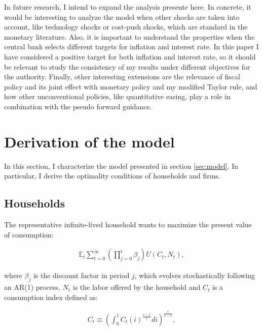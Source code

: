 \documentclass[12pt]{article}
\numberwithin{equation}{section}
\begin{document}
In future research, I intend to expand the analysis presente here. In concrete, it would be interesting to analyze the model when other shocks are taken into account, like technology shocks or cost-push shocks, which are standard in the monetary literature. Also, it is important to understand the properties when the central bank selects different targets for inflation and interest rate. In this paper I have considered a positive target for both inflation and interest rate, so it should be relevant to study the consistency of my results under different objectives for the authority. Finally, other interesting extensions are the relevance of fiscal policy and its joint effect with monetary policy and my modified Taylor rule, and how other unconventional policies, like quantitative easing, play a role in combination with the pseudo forward guidance.




\newpage\appendix

\section{Derivation of the model}\label{app:derivation}

In this section, I characterize the model presented in section \ref{sec:model}. In particular, I derive the optimality conditions of households and firms.

\subsection{Households}

The representative infinite-lived household wants to maximize the present value of consumption:

\begin{align*}
\mathbb{E}_t\sum_{t=0}^{\infty}\left(\prod_{j=0}^t\beta_j\right)U(C_t,N_t),
\end{align*}

\noindent where $\beta_j$ is the discount factor in period $j$, which evolves stochastically following an AR(1) process, $N_t$ is the labor offered by the household and $C_t$ is a consumption index defined as:

\begin{align*}
C_t\equiv\left(\int_0^1C_t(i)^{\frac{\epsilon-1}{\epsilon}}di\right)^{\frac{\epsilon}{\epsilon-1}},
\end{align*}
\end{document}
